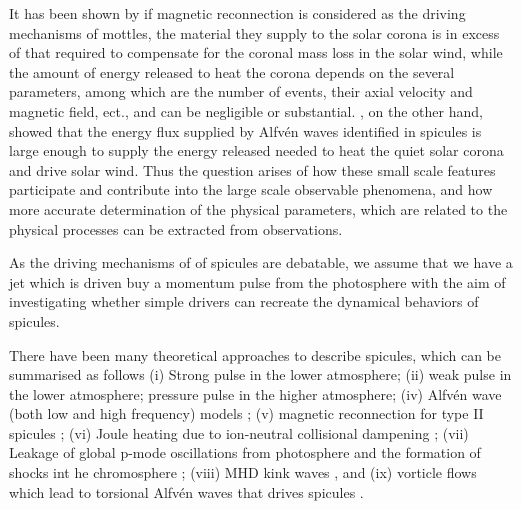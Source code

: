 \documentclass[12pt]{ociamthesis}
\newcommand{\Alfven}{Alfv\'{e}n }
\begin{document}
\par It has been shown by \cite{Tsiropoula2004} if magnetic reconnection is considered as the driving mechanisms of mottles, the material they supply to the solar corona is in excess of that required to compensate for the coronal mass loss in the solar wind, while the amount of energy released to heat the corona depends on the several parameters, among which are the number of events, their axial velocity and magnetic field, ect., and can be negligible or substantial. \cite{De_Pontieu2007ApJ}, on the other hand, showed that the energy flux supplied by \Alfven waves identified in spicules is large enough to supply the energy released needed to heat the quiet solar corona and drive solar wind. Thus the question arises of how these small scale features participate and contribute into the large scale observable phenomena, and how more accurate determination of the physical parameters, which are related to the physical processes can be extracted from observations.
\par As the driving mechanisms of of spicules are debatable, we assume that we have a jet which is driven buy a momentum pulse from the photosphere with the aim of investigating whether simple drivers can recreate the dynamical behaviors of spicules.
\par There have been many theoretical approaches to describe spicules, which can be summarised as follows (i) Strong pulse in the lower atmosphere; (ii) weak pulse in the lower atmosphere; pressure pulse in the higher atmosphere; (iv) \Alfven wave (both low and high frequency) models \cite{Zaqarashvili_2009SSRv}; (v) magnetic reconnection for type II spicules \cite{Pontieu2007PASJ, Sterling2010ApJ}; (vi) Joule heating due to ion-neutral collisional dampening \cite{James2003AA}; (vii) Leakage of global p-mode oscillations from photosphere and the formation of shocks int he chromosphere \cite{Pontieu2004Natur,Zaqarashvili2007A&A}; (viii) MHD kink waves \citep{Kukhianidze2006A&A}, and (ix) vorticle flows which lead to torsional \Alfven waves that drives spicules \citep{Iijima2017ApJ}.
\end{document}
